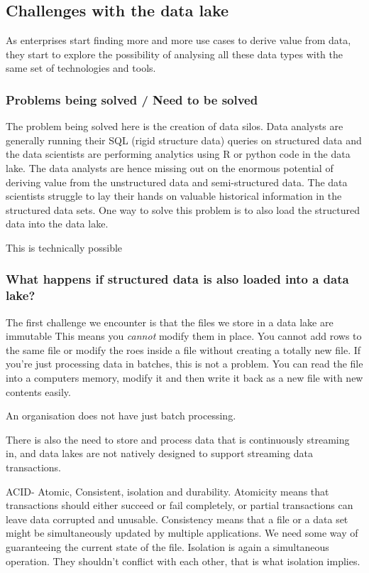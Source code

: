 

\subsection{Challenges with the data lake}

As enterprises start finding more and more use cases to derive value from data, they start to explore the possibility of analysing all these data types with the same set of technologies and tools.

\subsubsection{Problems being solved / Need to be solved}
The problem being solved here is the creation of data silos.
Data analysts are generally running their SQL (rigid structure data) queries on structured data and the data scientists are performing analytics using R or python code in the data lake.
The data analysts are hence missing out on the enormous potential of deriving value from the unstructured data and semi-structured data.
The data scientists struggle to lay their hands on valuable historical information in the structured data sets.
One way to solve this problem is to also load the structured data into the data lake.

\begin{note}
    This is technically possible
\end{note}

\subsubsection{What happens if structured data is also loaded into a data lake?}
The first challenge we encounter is that the files we store in a data lake are immutable
This means you \textit{cannot} modify them in place.
You cannot add rows to the same file or modify the roes inside a file without creating a totally new file.
If you're just processing data in batches, this is not a problem.
You can read the file into a computers memory, modify it and then write it back as a new file with new contents easily.

An organisation does not have just batch processing.
\begin{note}
    There is also the need to store and process data that is continuously streaming in, and data lakes are not natively designed to support streaming data transactions.
\end{note}
ACID- Atomic, Consistent, isolation and durability.
Atomicity means that transactions should either succeed or fail completely, or partial transactions can leave data corrupted and unusable.
Consistency means that a file or a data set might be simultaneously updated by multiple applications.
We need some way of guaranteeing the current state of the file.
Isolation is again a simultaneous operation.
They shouldn't conflict with each other, that is what isolation implies.

